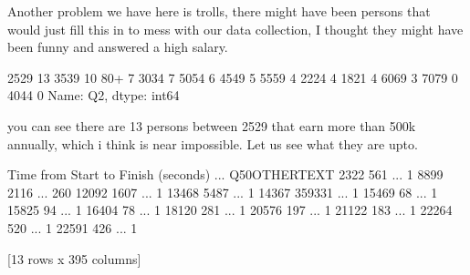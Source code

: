 \documentclass[letterpaper,10pt,english]{jupyterBook}
\begin{document}
\sphinxAtStartPar
Another problem we have here is trolls, there might have been persons that would just fill this in to mess with our data collection, I thought they might have been funny and answered a high salary.

\begin{sphinxVerbatim}[commandchars=\\\{\}]
\PYG{p}{[}\PYG{p}{]}
\end{sphinxVerbatim}

\begin{sphinxVerbatim}[commandchars=\\\{\}]
25\PYGZhy{}29    13
35\PYGZhy{}39    10
80+       7
30\PYGZhy{}34     7
50\PYGZhy{}54     6
45\PYGZhy{}49     5
55\PYGZhy{}59     4
22\PYGZhy{}24     4
18\PYGZhy{}21     4
60\PYGZhy{}69     3
70\PYGZhy{}79     0
40\PYGZhy{}44     0
Name: Q2, dtype: int64
\end{sphinxVerbatim}

\sphinxAtStartPar
you can see there are 13 persons between 25\sphinxhyphen{}29 that earn more than 500k annually, which i think is near impossible. Let us see what they are upto.

\begin{sphinxVerbatim}[commandchars=\\\{\}]
\PYG{p}{[}  \PYG{p}{]}
\end{sphinxVerbatim}

\begin{sphinxVerbatim}[commandchars=\\\{\}]
      Time from Start to Finish (seconds)  ... Q50\PYGZus{}OTHER\PYGZus{}TEXT
2322                                  561  ...             \PYGZhy{}1
8899                                 2116  ...            260
12092                                1607  ...             \PYGZhy{}1
13468                                5487  ...             \PYGZhy{}1
14367                              359331  ...             \PYGZhy{}1
15469                                  68  ...             \PYGZhy{}1
15825                                  94  ...             \PYGZhy{}1
16404                                  78  ...             \PYGZhy{}1
18120                                 281  ...             \PYGZhy{}1
20576                                 197  ...             \PYGZhy{}1
21122                                 183  ...             \PYGZhy{}1
22264                                 520  ...             \PYGZhy{}1
22591                                 426  ...             \PYGZhy{}1

[13 rows x 395 columns]
\end{sphinxVerbatim}
\end{document}
